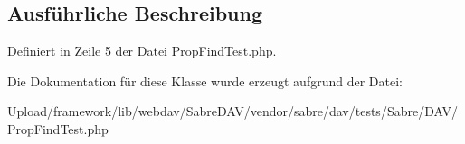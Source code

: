 \subsection{Ausführliche Beschreibung}


Definiert in Zeile 5 der Datei Prop\+Find\+Test.\+php.



Die Dokumentation für diese Klasse wurde erzeugt aufgrund der Datei\+:\begin{DoxyCompactItemize}
\item 
Upload/framework/lib/webdav/\+Sabre\+D\+A\+V/vendor/sabre/dav/tests/\+Sabre/\+D\+A\+V/Prop\+Find\+Test.\+php\end{DoxyCompactItemize}
